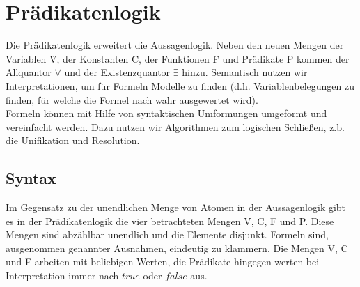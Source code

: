 \section{Prädikatenlogik}
Die Prädikatenlogik erweitert die Aussagenlogik. Neben den neuen Mengen der Variablen \f{V}, der Konstanten \f{C}, der Funktionen \f{F} und Prädikate \f{P} kommen der Allquantor $\forall$ und der Existenzquantor $\exists$ hinzu. Semantisch nutzen wir Interpretationen, um für Formeln Modelle zu finden (d.h. Variablenbelegungen zu finden, für welche die Formel nach wahr ausgewertet wird). \\
Formeln können mit Hilfe von syntaktischen Umformungen umgeformt und vereinfacht werden. Dazu nutzen wir Algorithmen zum logischen Schließen, z.b. die Unifikation und Resolution. 

\subsection{Syntax}
    Im Gegensatz zu der unendlichen Menge von Atomen in der Aussagenlogik gibt es in der Prädikatenlogik die vier betrachteten Mengen V, C, F und P. Diese Mengen sind abzählbar unendlich und die Elemente disjunkt. Formeln sind, ausgenommen genannter Ausnahmen, eindeutig zu klammern. Die Mengen V, C und F arbeiten mit beliebigen Werten, die Prädikate hingegen werten bei Interpretation immer nach $true$ oder $false$ aus. 
